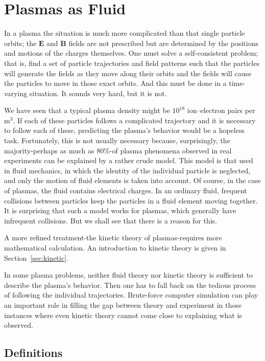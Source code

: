 \documentclass[
  notoc %
]{tufte-book}
\begin{document}
\hypertarget{sec:fluid}{%
\chapter{Plasmas as Fluid}\label{sec:fluid}}

In a plasma the situation is much more complicated than that single
particle orbits; the \(\mathbf{E}\) and \(\mathbf{B}\) fields are not
prescribed but are determined by the positions and motions of the
charges themselves. One must solve a self-consistent problem; that is,
find a set of particle trajectories and field patterns such that the
particles will generate the fields as they move along their orbits and
the fields will cause the particles to move in those exact orbits. And
this must be done in a time-varying situation. It sounds very hard, but
it is not.

We have seen that a typical plasma density might be \(10^{18}\)
ion--electron pairs per \(\text{m}^3\). If each of these particles
follows a complicated trajectory and it is necessary to follow each of
these, predicting the plasma's behavior would be a hopeless task.
Fortunately, this is not usually necessary because, surprisingly, the
majority-perhaps as much as 80\%-of plasma phenomena observed in real
experiments can be explained by a rather crude model. This model is that
used in fluid mechanics, in which the identity of the individual
particle is neglected, and only the motion of fluid elements is taken
into account. Of course, in the case of plasmas, the fluid contains
electrical charges. In an ordinary fluid, frequent collisions between
particles keep the particles in a fluid element moving together. It is
surprising that such a model works for plasmas, which generally have
infrequent collisions. But we shall see that there is a reason for this.

A more refined treatment-the kinetic theory of plasmas-requires more
mathematical calculation. An introduction to kinetic theory is given in
Section~\ref{sec:kinetic}.

In some plasma problems, neither fluid theory nor kinetic theory is
sufficient to describe the plasma's behavior. Then one has to fall back
on the tedious process of following the individual trajectories.
Brute-force computer simulation can play an important role in filling
the gap between theory and experiment in those instances where even
kinetic theory cannot come close to explaining what is observed.

\hypertarget{definitions}{%
\section{Definitions}\label{definitions}}
\end{document}
